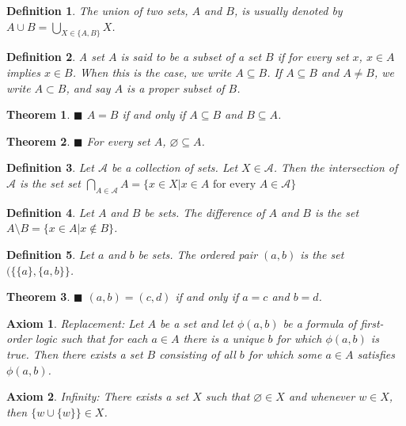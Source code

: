 \documentclass[a4paper]{article}
\newtheorem{mytheorem}{Theorem}
\newtheorem{axiom}{Axiom}
\newtheorem{mydef}{Definition}
\numberwithin{mytheorem}{section}
\numberwithin{mydef}{section}
\numberwithin{axiom}{section}
\numberwithin{example}{section}
\newcommand{\done}{$\blacksquare$ }
\begin{document}
\begin{mydef} The union of two sets, $A$ and $B$, is usually denoted by $A \cup B = \bigcup\limits_{X \in \{ A,B\}} X$.
\end{mydef}

\begin{mydef} A set $A$ is said to be a subset of a set $B$ if for every set $x$, $x \in A$ implies $x \in B$. When this is the case, we write $A \subseteq B$. If $A \subseteq B$ and $A \neq B$, we write $A \subset B$, and say $A$ is a proper subset of $B$. 
\end{mydef}

\begin{mytheorem} \done $A = B$ if and only if $A \subseteq B$ and $B \subseteq A$. \end{mytheorem}

\begin{mytheorem} \done For every set $A$, $\varnothing \subseteq A$. \end{mytheorem}

\begin{mydef} Let $\mathcal{A}$ be a collection of sets. Let $X \in \mathcal{A}$. Then the intersection of $\mathcal{A}$ is the set set $\bigcap\limits_{A \in \mathcal{A}} A = \{ x \in X | x \in A \text{ for every } A \in \mathcal{A} \}$
\end{mydef}

\begin{mydef} Let $A$ and $B$ be sets. The difference of $A$ and $B$ is the set $A \setminus B = \{ x \in A | x \notin B \}$. 
\end{mydef}

\begin{mydef} Let $a$ and $b$ be sets. The ordered pair $(a,b)$ is the set $( \{ \{ a \}, \{ a, b \} \}$. 
\end{mydef}

\begin{mytheorem} \done $(a,b) = (c,d)$ if and only if $a = c$ and $b = d$. \end{mytheorem}

\begin{axiom} Replacement: Let $A$ be a set and let $\phi(a,b)$ be a formula of first-order logic such that for each $a \in A$ there is a unique $b$ for which $\phi(a,b)$ is true. Then there exists a set $B$ consisting of all $b$ for which some $a \in A$ satisfies $\phi(a,b)$.  
\end{axiom}

\begin{axiom} Infinity: There exists a set $X$ such that $\varnothing \in X$ and whenever $w \in X$, then $\{ w \cup \{ w \} \} \in X$.
\end{axiom}
\end{document}
